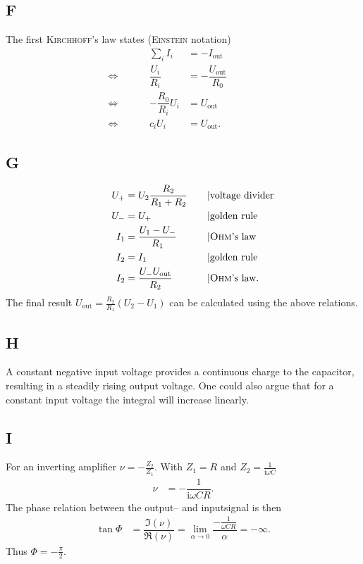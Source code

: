 \documentclass[a4paper,10pt]{article}
\numberwithin{equation}{section}
\begin{document}
\begin{multicols}{2}
	\subsection{F} \label{pre:F}
	The first \textsc{Kirchhoff}'s law states (\textsc{Einstein} notation)
	\begin{align}
		                &  &  &  & \sum_{i}^{}I_i       & = -I_\text{out}              &  &  &  & \\
		\Leftrightarrow &  &  &  & \dfrac{U_i}{R_i}     & = -\dfrac{U_\text{out}}{R_0} &  &  &  & \\
		\Leftrightarrow &  &  &  & -\dfrac{R_0}{R_i}U_i & = U_\text{out}               &  &  &  & \\
		\Leftrightarrow &  &  &  & c_iU_i               & = U_\text{out}.              &  &  &  &
	\end{align}

	\subsection{G} \label{pre:G}
	\begin{align}
		 &  &  &  & U_+ & = U_2\dfrac{R_2}{R_1+R_2}      &  &  &  & |\text{voltage divider}    \\
		 &  &  &  & U_- & = U_+                          &  &  &  & |\text{golden rule}        \\
		 &  &  &  & I_1 & = \dfrac{U_1-U_-}{R_1}         &  &  &  & |\text{\textsc{Ohm}'s law} \\
		 &  &  &  & I_2 & = I_1                          &  &  &  & |\text{golden rule}        \\
		 &  &  &  & I_2 & = \dfrac{U_-U_\text{out}}{R_2} &  &  &  & |\text{\textsc{Ohm}'s law}
		.\end{align}
	The final result $U_\text{out}=\tfrac{R_2}{R_1}\left(U_2-U_1\right)$ can be calculated using the above relations.

	\subsection{H}
	A constant negative input voltage provides a continuous charge to the capacitor, resulting in a steadily rising output voltage.
	One could also argue that for a constant input voltage the integral will increase linearly.

	\subsection{I}
	For an inverting amplifier $\nu =-\tfrac{Z_2}{Z_1}$.
	With $Z_1=R$ and $Z_2=\tfrac{1}{\text{i}\omega C}$
	\begin{align}
		 &  &  &  & \nu & = -\dfrac{1}{\text{i}\omega CR}. &  &  &  &
	\end{align}
	The phase relation between the output-- and inputsignal is then
	\begin{align}
		\tan \Phi & = \dfrac{\mathfrak{I}\left(\nu \right)}{\mathfrak{R}\left(\nu \right)}=\lim_{\alpha \rightarrow 0}\dfrac{-\tfrac{1}{\omega CR}}{\alpha }=-\infty
		.\end{align}
	Thus $\Phi =-\tfrac{\pi }{2}$.


\end{multicols}
\end{document}

